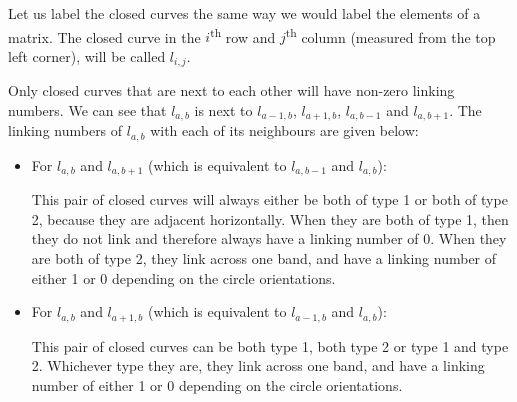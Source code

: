 \documentclass[10pt,a4paper]{report}
\theoremstyle{definition}
\theoremstyle{remark}
\theoremstyle{example}
\begin{document}
  Let us label the closed curves the same way we would label the elements of a matrix. The closed curve in the $i$\textsuperscript{th} row and $j$\textsuperscript{th} column (measured from the top left corner), will be called $l_{i,j}$.

Only closed curves that are next to each other will have non-zero linking numbers. We can see that $ l_{a,b}$ is next to $ l_{a-1,b}$, $ l_{a+1,b}$, $ l_{a,b-1}$ and $ l_{a,b+1}$. The linking numbers of $ l_{a,b}$ with each of its neighbours are given below:

\begin{itemize}
\item For $ l_{a,b}$ and $ l_{a,b+1}$ (which is equivalent to $ l_{a,b-1}$ and $ l_{a,b}$):

This pair of closed curves will always either be both of type 1 or both of type 2, because they are adjacent horizontally. When they are both of type 1, then they do not link and therefore always have a linking number of 0. When they are both of type 2, they link across one band, and have a linking number of either 1 or 0 depending on the circle orientations.
\item For $ l_{a,b}$ and $ l_{a+1,b}$ (which is equivalent to $ l_{a-1,b}$ and $ l_{a,b}$):

This pair of closed curves can be both type 1, both type 2 or type 1 and type 2. Whichever type they are, they link across one band, and have a linking number of either 1 or 0 depending on the circle orientations.
\end{itemize}
\end{document}
